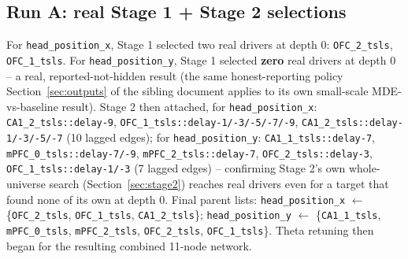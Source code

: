 \documentclass[11pt]{article}
\begin{document}
\subsection{Run A: real Stage 1 + Stage 2 selections}
For \texttt{head\_position\_x}, Stage 1 selected two real drivers at depth 0: \texttt{OFC\_2\_tsls}, \texttt{OFC\_1\_tsls}. For \texttt{head\_position\_y}, Stage 1 selected \textbf{zero} real drivers at depth 0 -- a real, reported-not-hidden result (the same honest-reporting policy Section~\ref{sec:outputs} of the sibling document applies to its own small-scale MDE-vs-baseline result). Stage 2 then attached, for \texttt{head\_position\_x}: \texttt{CA1\_2\_tsls::delay-9}, \texttt{OFC\_1\_tsls::delay-1/-3/-5/-7/-9}, \texttt{CA1\_2\_tsls::delay-1/-3/-5/-7} (10 lagged edges); for \texttt{head\_position\_y}: \texttt{CA1\_1\_tsls::delay-7}, \texttt{mPFC\_0\_tsls::delay-7/-9}, \texttt{mPFC\_2\_tsls::delay-7}, \texttt{OFC\_2\_tsls::delay-3}, \texttt{OFC\_1\_tsls::delay-1/-3} (7 lagged edges) -- confirming Stage 2's own whole-universe search (Section~\ref{sec:stage2}) reaches real drivers even for a target that found none of its own at depth 0. Final parent lists: \texttt{head\_position\_x} $\leftarrow$ \{\texttt{OFC\_2\_tsls}, \texttt{OFC\_1\_tsls}, \texttt{CA1\_2\_tsls}\}; \texttt{head\_position\_y} $\leftarrow$ \{\texttt{CA1\_1\_tsls}, \texttt{mPFC\_0\_tsls}, \texttt{mPFC\_2\_tsls}, \texttt{OFC\_2\_tsls}, \texttt{OFC\_1\_tsls}\}. Theta retuning then began for the resulting combined 11-node network.
\end{document}
